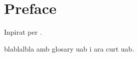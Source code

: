 \documentclass[../../main.tex]{subfiles}
\begin{document}
\chapter*{Preface} \label{ch:preface} 

Inpirat per \cite{adams2009hitchhiker}. 


blablalbla amb glosary \gls{uab} i ara curt \gls{uab}.
\end{document}
